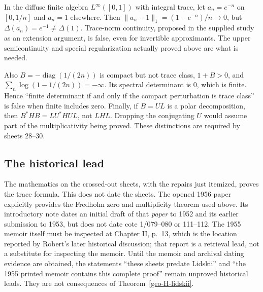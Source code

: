 \begin{example}
\label{geo-H-continuity}
In the diffuse finite algebra $L^\infty([0,1])$ with integral trace, let
$a_n=e^{-n}$ on $[0,1/n]$ and $a_n=1$ elsewhere. Then
$\|a_n-1\|_1=(1-e^{-n})/n\to0$, but
$\Delta(a_n)=e^{-1}\ne\Delta(1)$. Trace-norm continuity, proposed in the
supplied study as an extension argument, is false, even for invertible
approximants. The upper semicontinuity and special regularization actually
proved above are what is needed.

Also $B=-\operatorname{diag}(1/(2n))$ is compact but not trace class,
$1+B>0$, and $\sum_n\log(1-1/(2n))=-\infty$. Its spectral determinant is
$0$, which is finite. Hence ``finite determinant if and only if the compact
perturbation is trace class'' is false when finite includes zero. Finally,
if $B=UL$ is a polar decomposition, then
$B^*HB=L U^*HU L$, not $LHL$. Dropping the conjugating $U$ would assume
part of the multiplicativity being proved. These distinctions are required
by sheets 28--30.
\end{example}

\subsection{The historical lead}
The mathematics on the crossed-out sheets, with the repairs just itemized,
proves the trace formula. This does not date the sheets. The opened 1956
paper explicitly provides the Fredholm zero and multiplicity theorem used
above. Its introductory note dates an initial draft of that \emph{paper}
to 1952 and its earlier submission to 1953, but does not date cote 1/079--080
or 111--112. The 1955 memoir itself must be inspected at Chapter II, p.~13,
which is the location reported by Robert's later historical discussion;
that report is a retrieval lead, not a substitute for inspecting the memoir.
Until the memoir and archival dating evidence are obtained, the statements
``these sheets predate Lidskii'' and ``the 1955 printed memoir contains this
complete proof'' remain unproved historical leads. They are not consequences
of Theorem~\ref{geo-H-lidskii}.
